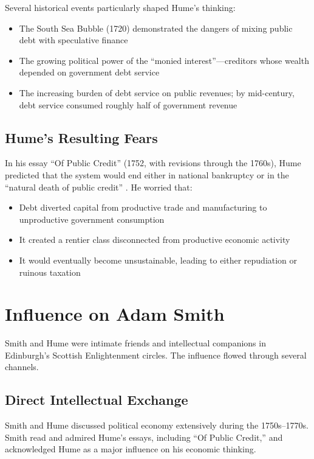 \documentclass[12pt]{article}
\begin{document}
Several historical events particularly shaped Hume's thinking:

\begin{itemize}
\item The South Sea Bubble (1720) demonstrated the dangers of mixing public debt with speculative finance
\item The growing political power of the ``monied interest''—creditors whose wealth depended on government debt service
\item The increasing burden of debt service on public revenues; by mid-century, debt service consumed roughly half of government revenue
\end{itemize}

\subsection{Hume's Resulting Fears}

In his essay ``Of Public Credit'' (1752, with revisions through the 1760s), Hume predicted that the system would end either in national bankruptcy or in the ``natural death of public credit'' \citep{hume1752public}. He worried that:

\begin{itemize}
\item Debt diverted capital from productive trade and manufacturing to unproductive government consumption
\item It created a rentier class disconnected from productive economic activity
\item It would eventually become unsustainable, leading to either repudiation or ruinous taxation
\end{itemize}

\section{Influence on Adam Smith}

Smith and Hume were intimate friends and intellectual companions in Edinburgh's Scottish Enlightenment circles. The influence flowed through several channels.

\subsection{Direct Intellectual Exchange}

Smith and Hume discussed political economy extensively during the 1750s--1770s. Smith read and admired Hume's essays, including ``Of Public Credit,'' and acknowledged Hume as a major influence on his economic thinking.
\end{document}
